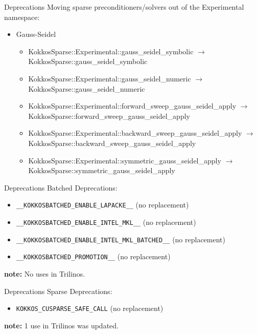 \begin{frame}[fragile]{Deprecations}
  Moving sparse preconditioners/solvers out of the {\ttfamily Experimental} namespace:
  \begin{itemize}
  \item Gauss-Seidel
    \begin{itemize}
    \item {\ttfamily KokkosSparse::Experimental::gauss\_seidel\_symbolic} $\rightarrow$ {\ttfamily KokkosSparse::gauss\_seidel\_symbolic}
    \item {\ttfamily KokkosSparse::Experimental::gauss\_seidel\_numeric} $\rightarrow$ {\ttfamily KokkosSparse::gauss\_seidel\_numeric}
    \item {\ttfamily KokkosSparse::Experimental::forward\_sweep\_gauss\_seidel\_apply} $\rightarrow$ {\ttfamily KokkosSparse::forward\_sweep\_gauss\_seidel\_apply}
    \item {\ttfamily KokkosSparse::Experimental::backward\_sweep\_gauss\_seidel\_apply} $\rightarrow$ {\ttfamily KokkosSparse::backward\_sweep\_gauss\_seidel\_apply}
    \item {\ttfamily KokkosSparse::Experimental::symmetric\_gauss\_seidel\_apply} $\rightarrow$ {\ttfamily KokkosSparse::symmetric\_gauss\_seidel\_apply}
    \end{itemize}
  \end{itemize}
\end{frame}

\begin{frame}[fragile]{Deprecations}
  Batched Deprecations:
  \vspace{10pt}

  \begin{itemize}
  \item \texttt{\_\_KOKKOSBATCHED\_ENABLE\_LAPACKE\_\_} (no replacement)
  \item \texttt{\_\_KOKKOSBATCHED\_ENABLE\_INTEL\_MKL\_\_} (no replacement) 
  \item \texttt{\_\_KOKKOSBATCHED\_ENABLE\_INTEL\_MKL\_BATCHED\_\_} (no replacement)
  \item \texttt{\_\_KOKKOSBATCHED\_PROMOTION\_\_} (no replacement) 
  \end{itemize}
  
  \textbf{note:} No uses in Trilinos.

\end{frame}

\begin{frame}[fragile]{Deprecations}
  Sparse Deprecations:
  \vspace{10pt}

  \begin{itemize}
  \item \texttt{KOKKOS\_CUSPARSE\_SAFE\_CALL} (no replacement)
  \end{itemize}
  
  \textbf{note:} 1 use in Trilinos was updated.

\end{frame}